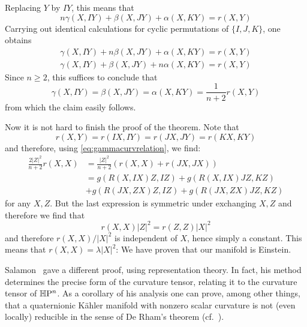 \begin{myproof}
\begin{myproof}
		Replacing $Y$ by $IY$, this means that
		\begin{equation*}
			n\gamma(X,IY)+\beta(X,JY)+\alpha(X,KY)=r(X,Y)
		\end{equation*}
		Carrying out identical calculations for cyclic permutations of $\{I,J,K\}$, one obtains
		\begin{align*}
			\gamma(X,IY)+n\beta(X,JY)+\alpha(X,KY)=r(X,Y)\\
			\gamma(X,IY)+\beta(X,JY)+n\alpha(X,KY)=r(X,Y)
		\end{align*}
		Since $n\geq 2$, this suffices to conclude that
		\begin{equation*}
			\gamma(X,IY)=\beta(X,JY)=\alpha(X,KY)=\frac{1}{n+2}r(X,Y)
		\end{equation*}
		from which the claim easily follows.
	\end{myproof}
	Now it is not hard to finish the proof of the theorem. Note that
	\begin{equation*}
		r(X,Y)=r(IX,IY)=r(JX,JY)=r(KX,KY)
	\end{equation*}
	and therefore, using \eqref{eq:gammacurvrelation}, we find:
	\begin{align*}
		\frac{2\lvert Z\rvert^2}{n+2}r(X,X)
		&=\frac{\lvert Z\rvert^2}{n+2}(r(X,X)+r(JX,JX))\\
		&=g(R(X,IX)Z,IZ)+g(R(X,IX)JZ,KZ)\\
		&+g(R(JX,ZX)Z,IZ)+g(R(JX,ZX)JZ,KZ)
	\end{align*}
	for any $X,Z$. But the last expression is symmetric under exchanging $X,Z$ and therefore we find that
	\begin{equation*}
		r(X,X)\lvert Z\rvert^2=r(Z,Z)\lvert X\rvert^2
	\end{equation*}
	and therefore $r(X,X)/\lvert X\rvert^2$ is independent of $X$, hence simply a constant. This means that $r(X,X)=\lambda \lvert X\rvert^2$: We have proven that our manifold is Einstein.
\end{myproof}

\begin{rem}
	Salamon~\cite{Sal1982} gave a different proof, using representation theory. In fact, his method determines the precise form of the curvature tensor, relating it to the curvature tensor of $\mathbb{H}\mathrm{P}^n$. As a corollary of his analysis one can prove, among other things, that a quaternionic K\"ahler manifold with nonzero scalar curvature is not (even locally) reducible in the sense of De Rham's theorem (cf.~\cite[Thm. 14.45]{Bes2008}).
\end{rem}


